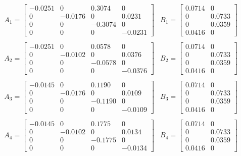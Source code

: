 \begin{align} %
	& A_1 =
	\begin{bmatrix}
		-0.0251 &       0    &  0.3074 &      0 \\
			0   &    -0.0176 &     0   & 0.0231 \\
			0   &       0    & -0.3074 &      0 \\
			0   &       0    &     0   & -0.0231
	\end{bmatrix}
	& B_1 =
	\begin{bmatrix}
	    0.0714 &       0 \\
			0  &  0.0733 \\
			0  &  0.0359 \\
		0.0416 &	      0
	\end{bmatrix} \nonumber \\ \nonumber \\
	& A_2 =
	\begin{bmatrix}
	   -0.0251 &        0 &   0.0578 &       0 \\
			0  & -0.0102  &       0  &  0.0376 \\
			0  &       0  & -0.0578  &       0 \\
			0  &       0  &       0  & -0.0376 
	\end{bmatrix}
	& B_2 =
	\begin{bmatrix}
		0.0714 &       0 \\
			0  &  0.0733 \\
			0  &  0.0359 \\
		0.0416 &      0
	\end{bmatrix} \nonumber \\ \nonumber \\
	& A_3 =
	\begin{bmatrix}
	   -0.0145 &        0 &   0.1190 &       0 \\
			0  & -0.0176  &       0  &  0.0109 \\
			0  &       0  & -0.1190  &       0 \\
			0  &       0  &       0  & -0.0109
	\end{bmatrix}
	& B_3 =
	\begin{bmatrix}
		0.0714 &       0 \\
			0  &  0.0733 \\
			0  &  0.0359 \\
		0.0416 &       0
	\end{bmatrix} \nonumber \\ \nonumber \\
	& A_4 =
	\begin{bmatrix}
	   -0.0145 &        0 &   0.1775 &       0 \\
			0  & -0.0102  &       0  &  0.0134 \\
			0  &       0  & -0.1775  &       0 \\
			0  &       0  &       0  & -0.0134
	\end{bmatrix}
	& B_4 =
	\begin{bmatrix}
	    0.0714 &       0 \\
			0  &  0.0733 \\
			0  &  0.0359 \\
		0.0416 &       0
	\end{bmatrix}
\end{align}
